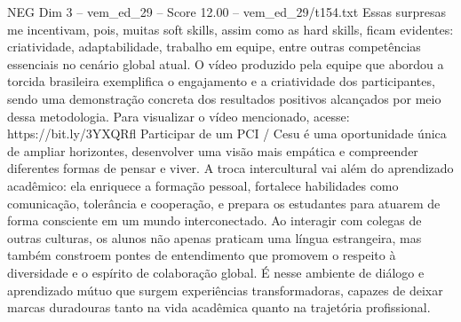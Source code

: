 \begin{textsample}{NEG Dim 3 – vem\_ed\_29 – Score 12.00 – vem\_ed\_29/t154.txt}
Essas surpresas me incentivam, pois, muitas soft skills, assim como as hard skills, ficam evidentes: criatividade, adaptabilidade, trabalho em equipe, entre outras competências essenciais no cenário global atual.
O vídeo produzido pela equipe que abordou a torcida brasileira exemplifica o engajamento e a criatividade dos participantes, sendo uma demonstração concreta dos resultados positivos alcançados por meio dessa metodologia.
Para visualizar o vídeo mencionado, acesse: https://bit.ly/3YXQRfl Participar de um PCI / Cesu é uma oportunidade única de ampliar horizontes, desenvolver uma visão mais empática e compreender diferentes formas de pensar e viver.
A troca intercultural vai além do aprendizado acadêmico: ela enriquece a formação pessoal, fortalece habilidades como comunicação, tolerância e cooperação, e prepara os estudantes para atuarem de forma consciente em um mundo interconectado.
Ao interagir com colegas de outras culturas, os alunos não apenas praticam uma língua estrangeira, mas também constroem pontes de entendimento que promovem o respeito à diversidade e o espírito de colaboração global.
É nesse ambiente de diálogo e aprendizado mútuo que surgem experiências transformadoras, capazes de deixar marcas duradouras tanto na vida acadêmica quanto na trajetória profissional.

\end{textsample}
